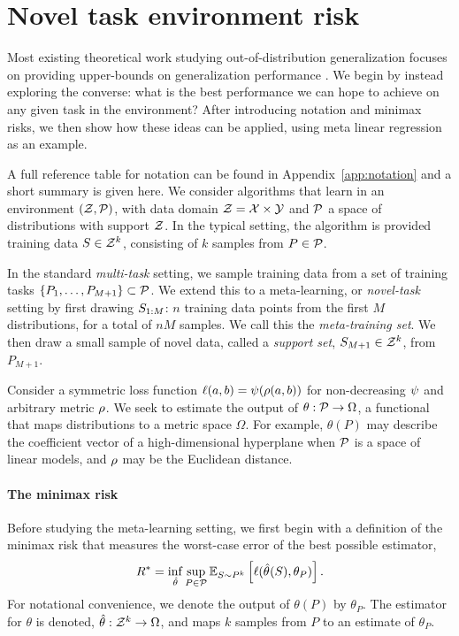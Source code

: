 \section{Novel task environment risk}
\label{sec:minimax_setting}
Most existing theoretical work studying out-of-distribution generalization focuses on providing upper-bounds on generalization performance \citep{ben2010theory, pentina2014pac, amit2017meta}. We begin by instead exploring the converse: what is the best performance we can hope to achieve on any given task in the environment? After introducing notation and minimax risks, we then show how these ideas can be applied, using meta linear regression as an example.

A full reference table for notation can be found in Appendix~\ref{app:notation} and a short summary is given here.
We consider algorithms that learn in an environment $(\mathcal{Z}, \mathcal{P})$, with data domain $\mathcal{Z} = \mathcal{X} \times \mathcal{Y}$ and $\mathcal{P}$ a space of distributions with support $\mathcal{Z}$. In the typical \iid setting, the algorithm is provided training data $S \in \mathcal{Z}^k$, consisting of $k$ \iid samples from $P \in \mathcal{P}$. 

In the standard {\it multi-task} setting, we sample training data from a set of training tasks $\{P_1,\ldots,P_{M+1}\} \subset \mathcal{P}$.
We extend this to a meta-learning, or {\it novel-task} setting by first drawing $S_{1:M}$: $n$ training data points from the first $M$ distributions, for a total of $nM$ samples. We call this the {\it meta-training set}. We then draw a small sample of novel data,
called a {\it support set}, $S_{M+1} \in \mathcal{Z}^k$, from $P_{M+1}$. 

Consider a symmetric loss function $\ell(a,b) = \psi(\rho(a, b))$ for non-decreasing $\psi$ and arbitrary metric $\rho$. We seek to estimate the output of $\theta: \mathcal{P} \rightarrow \Omega$, a functional that maps distributions to a metric space $\Omega$. For example, $\theta(P)$ may describe the coefficient vector of a high-dimensional hyperplane when $\mathcal{P}$ is a space of linear models, and $\rho$ may be the Euclidean distance.

\paragraph{The \iid minimax risk} Before studying the meta-learning setting, we first begin with a definition of the \iid minimax risk that measures the worst-case error of the best possible estimator,
\begin{equation}\label{eqn:iid_risk}
    R^* = \inf_{\hat{\theta}}\sup_{P \in \mathcal{P}}\mathbb{E}_{S\sim P^k}\left[ \ell(\hat{\theta}_{}(S), \theta_{P}) \right].
\end{equation}
For notational convenience, we denote the output of $\theta(P)$ by $\theta_P$. The estimator for $\theta$ is denoted, $\hat{\theta}: \mathcal{Z}^k \rightarrow \Omega$, and maps $k$ samples from $P$ to an estimate of $\theta_P$.

